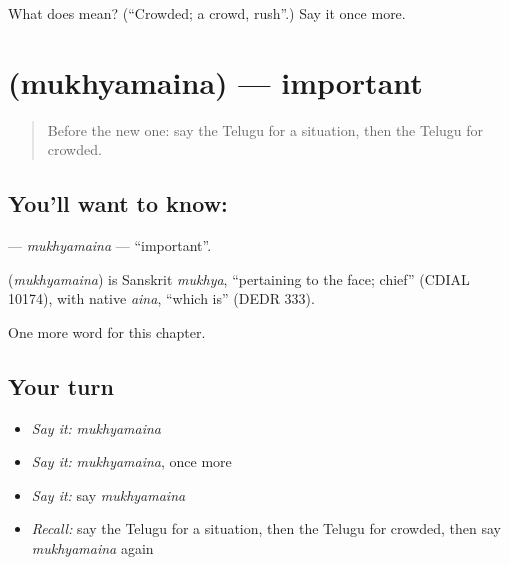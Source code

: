 \begin{tcolorbox}[breakable,colback=teal!4,colframe=teal!35!black,title={Before you move on}]
What does  mean? (\textquotedblleft{}Crowded; a crowd, rush\textquotedblright{}.) Say it once more.
\end{tcolorbox}
\section[\texorpdfstring{\te{ముఖ్యమైన} (mukhyamaina)}{ముఖ్యమైన (mukhyamaina)}]{ (mukhyamaina) — important}

\label{lesson:TE-C259-mukhyamaina}



\begin{quote}
Before the new one: say the Telugu for a situation, then the Telugu for crowded.
\end{quote}

\subsection*{You'll want to know: }
\textbf{} — \emph{mukhyamaina} — \textquotedblleft{}important\textquotedblright{}.

\begin{cousinweb}
\textbf{} (\emph{mukhyamaina}) is Sanskrit \emph{mukhya}, \textquotedblleft{}pertaining to the face; chief\textquotedblright{} (CDIAL 10174), with native \emph{aina}, \textquotedblleft{}which is\textquotedblright{} (DEDR 333).
\end{cousinweb}

\begin{grammarlens}[title={What you've built}]
One more word for this chapter.
\end{grammarlens}

\subsection*{Your turn}
\begin{itemize}
\raggedright
  \item \emph{Say it:} \emph{mukhyamaina}
  \item \emph{Say it:} \emph{mukhyamaina}, once more
  \item \emph{Say it:} say \emph{mukhyamaina}
  \item \emph{Recall:} say the Telugu for a situation, then the Telugu for crowded, then say \emph{mukhyamaina} again
\end{itemize}

